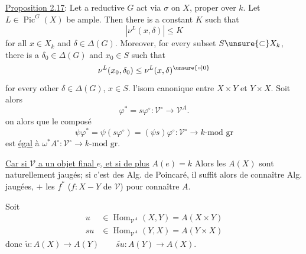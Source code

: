 \uline{Proposition 2.17}: Let a reductive $G$ act via $\sigma$ on $X$, proper over $k$. Let $L\in\operatorname{Pic}^G(X)$ be ample. Then there is a constant $K$ such that
\[
|\nu^L(x,\delta)|\leq K
\]
for all $x\in X_k$ and $\delta\in\Delta(G)$. Moreover, for every subset $S\unsure{\subset}X_k$, there is a $\delta_0\in\Delta(G)$ and $x_0\in S$ such that
\[
\nu^L(x_0,\delta_0)\leq\nu^L(x,\delta)^{\unsure{\circ|0}}
\]
for every other $\delta\in\Delta(G)$, $x\in S$.
 l'isom canonique entre $X\times Y$ et $Y\times X$. Soit alors
\[
\varphi^*=s\varphi^\circ:\mathcal V^\circ\longrightarrow\mathcal V^A.
\]
on  alors que le composé
\[
\psi\varphi^*=\psi(s\varphi^\circ)=(\psi s)\varphi^\circ:\mathcal V^\circ\longrightarrow k\text{-mod gr}
\]
est  \uline{égal} à $\omega^*A^\circ:\mathcal V^\circ\longrightarrow k\text{-mod gr}$.


\uline{Car si $\mathcal V$ a un objet final $e$, et si de plus} $A(e)=k$  Alors les $A(X)$ sont naturellement jaugés; si c'est des Alg. de Poincaré, il suffit alors de connaître  Alg. jaugées, $+$ les $f^*$ ($f:X-Y$ de $\mathcal V$) pour connaître $A$.

Soit
\[
\begin{aligned}
u&\in\operatorname{Hom}_{\mathcal V^A}(X,Y)=A(X\times Y)\\
su&\in\operatorname{Hom}_{\mathcal V^A}(Y,X)=A(Y\times X)
\end{aligned}
\]
donc $\tilde u:A(X)\longrightarrow A(Y)\qquad\widetilde{su}:A(Y)\longrightarrow A(X)$.

